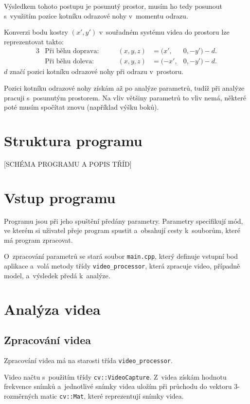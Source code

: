 Výsledkem tohoto postupu je posunutý prostor, musím ho tedy posunout s~využitím pozice kotníku odrazové nohy v~momentu odrazu.

Konverzi bodu kostry $(x',y')$ v~souřadném systému videa do prostoru lze reprezentovat takto:
\begin{alignat*}{3}
&\text{Při běhu doprava:} &\qquad (x,y,z)&=(x',&0,-y')-d. \\
&\text{Při běhu doleva:} &\qquad (x,y,z)&=(-x',&0,-y')-d.
\end{alignat*}
$d$ značí pozici kotníku odrazové nohy při odrazu v~prostoru.

Pozici kotníku odrazové nohy získám až po analýze parametrů, tudíž při analýze pracuji s~posunutým prostorem. Na vliv většiny parametrů to vliv nemá, některé poté musím spočítat znovu (například výšku boků).




\section{Struktura programu}

[SCHÉMA PROGRAMU A POPIS TŘÍD]




\section{Vstup programu}

Programu jsou při jeho spuštění předány parametry. Parametry specifikují mód, ve kterém si uživatel přeje program spustit a~obsahují cesty k~souborům, které má program zpracovat.

O~zpracování parametrů se stará soubor \texttt{main.cpp}, který definuje vstupní bod aplikace a~volá metody třídy \texttt{video\_processor}, která zpracuje video, případně model, a~výsledek předá k~analýze.




\section{Analýza videa}

\subsection{Zpracování videa}

Zpracování videa má na starosti třída \texttt{video\_processor}. 

Video načtu s~použitím třídy \texttt{cv::VideoCapture}. Z~videa získám hodnotu frekvence snímků a~jednotlivé snímky videa uložím při průchodu do vektoru $3$-rozměrných matic \texttt{cv::Mat}, které reprezentují snímky videa.

